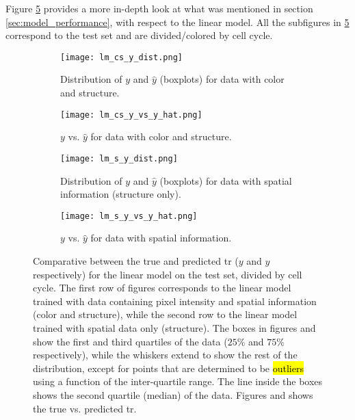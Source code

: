 
\glsresetall
\graphicspath{{./Sections/Results/Resources/}}


Figure \ref{fig:results:lm_performance} provides a more in-depth look at what was mentioned in section \ref{sec:model_performance}, with respect to the linear model. All the subfigures in \ref{fig:results:lm_performance} correspond to the test set and are divided/colored by cell cycle.

\begin{figure}[!ht]
  \centering
  \begin{subfigure}[b]{.5\linewidth}
    \texttt{[image: lm\_cs\_y\_dist.png]}
    \caption{Distribution of $y$ and $\hat{y}$ (boxplots) for data with color and structure.}
    \label{fig:results:lm_performance:cs_dist}
  \end{subfigure}
  \begin{subfigure}[b]{.27\linewidth}
    \texttt{[image: lm\_cs\_y\_vs\_y\_hat.png]}
    \caption{$y$ vs. $\hat{y}$ for data with color and structure.}
    \label{fig:results:lm_performance:cs_y_vs_y_hat}
  \end{subfigure}%
  \vspace{3mm}
  \begin{subfigure}[b]{.5\linewidth}
    \texttt{[image: lm\_s\_y\_dist.png]}
    \caption{Distribution of $y$ and $\hat{y}$ (boxplots) for data with spatial information (structure only).}
    \label{fig:results:lm_performance:s_dist}
  \end{subfigure}
  \begin{subfigure}[b]{.27\linewidth}
    \texttt{[image: lm\_s\_y\_vs\_y\_hat.png]}
    \caption{$y$ vs. $\hat{y}$ for data with spatial information.}
    \label{fig:results:lm_performance:s_y_vs_y_hat}
  \end{subfigure}
  \caption{Comparative between the true and predicted \gls{tr} ($y$ and $\hat{y}$ respectively) for the linear model on the test set, divided by cell cycle. The first row of figures corresponds to the linear model trained with data containing pixel intensity and spatial information (color and structure), while the second row to the linear model trained with spatial data only (structure). The boxes in figures  and  show the first and third quartiles of the data ($25\%$ and $75\%$ respectively), while the whiskers extend to show the rest of the distribution, except for points that are determined to be \hl{outliers} using a function of the inter-quartile range. The line inside the boxes shows the second quartile (median) of the data. Figures  and  shows the true vs. predicted \gls{tr}.}
  \label{fig:results:lm_performance}
\end{figure}

